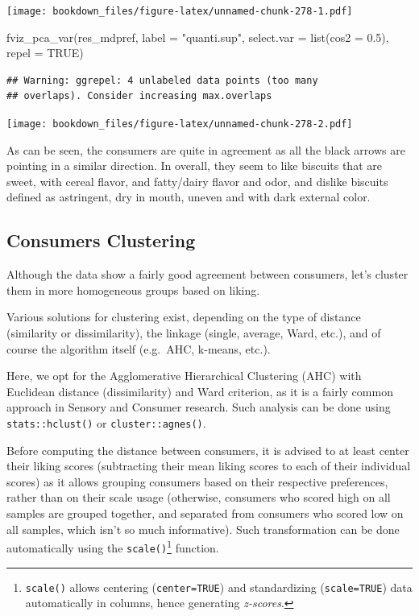 \documentclass[
]{krantz}
\makeatletter
\newenvironment{Shaded}{\begin{snugshade}}{\end{snugshade}}
\newcommand{\AttributeTok}[1]{\textcolor[rgb]{0.61,0.61,0.61}{#1}}
\newcommand{\ConstantTok}[1]{\textcolor[rgb]{0,0,0}{#1}}
\newcommand{\FloatTok}[1]{\textcolor[rgb]{0.06,0.06,0.06}{#1}}
\newcommand{\FunctionTok}[1]{\textcolor[rgb]{0,0,0}{#1}}
\newcommand{\NormalTok}[1]{#1}
\newcommand{\StringTok}[1]{\textcolor[rgb]{0.5,0.5,0.5}{#1}}
\renewenvironment{quote}{\begin{VF}}{\end{VF}}
\newenvironment{kframe}{%
\medskip{}
\setlength{\fboxsep}{.8em}
 \def\at@end@of@kframe{}%
 \ifinner\ifhmode%
  \def\at@end@of@kframe{\end{minipage}}%
  \begin{minipage}{\columnwidth}%
 \fi\fi%
 \def\FrameCommand##1{\hskip\@totalleftmargin \hskip-\fboxsep
 \colorbox{shadecolor}{##1}\hskip-\fboxsep
     \hskip-\linewidth \hskip-\@totalleftmargin \hskip\columnwidth}%
 \MakeFramed {\advance\hsize-\width
   \@totalleftmargin\z@ \linewidth\hsize
   \@setminipage}}%
 {\par\unskip\endMakeFramed%
 \at@end@of@kframe}
\renewenvironment{Shaded}{\begin{kframe}}{\end{kframe}}
\makeatother
\begin{document}
\texttt{[image: bookdown\_files/figure-latex/unnamed-chunk-278-1.pdf]}

\begin{Shaded}
\begin{Highlighting}[]
\FunctionTok{fviz\_pca\_var}\NormalTok{(res\_mdpref, }\AttributeTok{label =} \StringTok{"quanti.sup"}\NormalTok{, }\AttributeTok{select.var =} \FunctionTok{list}\NormalTok{(}\AttributeTok{cos2 =} \FloatTok{0.5}\NormalTok{), }\AttributeTok{repel =} \ConstantTok{TRUE}\NormalTok{)}
\end{Highlighting}
\end{Shaded}

\begin{verbatim}
## Warning: ggrepel: 4 unlabeled data points (too many
## overlaps). Consider increasing max.overlaps
\end{verbatim}

\texttt{[image: bookdown\_files/figure-latex/unnamed-chunk-278-2.pdf]}

As can be seen, the consumers are quite in agreement as all the black arrows are pointing in a similar direction.
In overall, they seem to like biscuits that are sweet, with cereal flavor, and fatty/dairy flavor and odor, and dislike biscuits defined as astringent, dry in mouth, uneven and with dark external color.

\hypertarget{hac}{%
\subsection{Consumers Clustering}\label{hac}}

Although the data show a fairly good agreement between consumers, let's cluster them in more homogeneous groups based on liking.

Various solutions for clustering exist, depending on the type of distance (similarity or dissimilarity), the linkage (single, average, Ward, etc.), and of course the algorithm itself (e.g.~AHC, k-means, etc.).

Here, we opt for the Agglomerative Hierarchical Clustering (AHC) with Euclidean distance (dissimilarity) and Ward criterion, as it is a fairly common approach in Sensory and Consumer research. Such analysis can be done using \texttt{stats::hclust()} or \texttt{cluster::agnes()}.

\begin{quote}
Before computing the distance between consumers, it is advised to at least center their liking scores (subtracting their mean liking scores to each of their individual scores) as it allows grouping consumers based on their respective preferences, rather than on their scale usage (otherwise, consumers who scored high on all samples are grouped together, and separated from consumers who scored low on all samples, which isn't so much informative). Such transformation can be done automatically using the \texttt{scale()}\footnote{\texttt{scale()} allows centering (\texttt{center=TRUE}) and standardizing (\texttt{scale=TRUE}) data automatically in columns, hence generating \emph{z-scores}.} function.
\end{quote}
\end{document}
